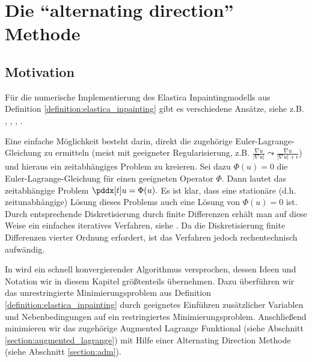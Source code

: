\documentclass{mythesis}
\begin{document}
\chapter{Die “alternating direction” Methode}


\section{Motivation} %


Für die numerische Implementierung des Elastica Inpaintingmodells aus Definition \ref{definition:elastica_inpainting} gibt es verschiedene Ansätze, siehe z.B. \cite{shen2002euler}, \cite{tai2011fast}, \cite{graphcuts}, \cite{normalstuff}.

Eine einfache Möglichkeit besteht darin, direkt die zugehörige Euler-Lagrange-Gleichung zu ermitteln (meist mit geeigneter Regularisierung, z.B. $\frac{\nabla u}{|\nabla u|} \leadsto \frac{\nabla u}{|\nabla u| + \epsilon}$) und hieraus ein zeitabhängiges Problem zu kreieren.
Sei dazu $\Phi(u) = 0$ die Euler-Lagrange-Gleichung für einen geeigneten Operator $\Phi$.
Dann lautet das zeitabhängige Problem
\begin{math}
    \pddx[t] u = \Phi(u).
\end{math}
Es ist klar, dass eine stationäre (d.h. zeitunabhängige) Lösung dieses Problems auch eine Lösung von $\Phi(u) = 0$ ist.
Durch entsprechende Diskretisierung durch finite Differenzen erhält man auf diese Weise ein einfaches iteratives Verfahren, siehe \cite{shen2002euler}.
Da die Diskretisierung finite Differenzen vierter Ordnung erfordert, ist das Verfahren jedoch rechentechnisch aufwändig.

In \cite{tai2011fast} wird ein schnell konvergierender Algorithmus versprochen, dessen Ideen und Notation wir in diesem Kapitel größtenteils übernehmen.
Dazu überführen wir das unrestringierte Minimierungsproblem aus Definition \ref{definition:elastica_inpainting} durch geeignetes Einführen zusätzlicher Variablen und Nebenbedingungen auf ein restringiertes Minimierungsproblem.
Anschließend minimieren wir das zugehörige Augmented Lagrange Funktional (siehe Abschnitt \ref{section:augmented_lagrange}) mit Hilfe einer Alternating Direction Methode (siehe Abschnitt \ref{section:adm}).
\end{document}

